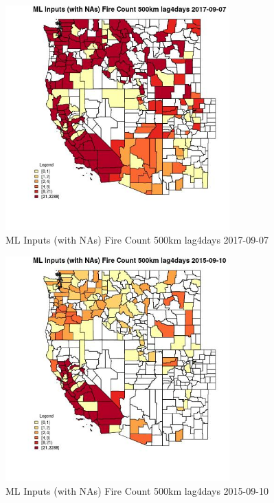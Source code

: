 \begin{figure} 
\centering  
\includegraphics[width=0.77\textwidth]{Code_Outputs/Report_ML_input_PM25_Step4_part_e_de_duplicated_aves_compiled_2019-05-21wNAs_CountyFire_Count_500km_lag4daysMean2017-09-07.jpg} 
\caption{\label{fig:Report_ML_input_PM25_Step4_part_e_de_duplicated_aves_compiled_2019-05-21wNAsCountyFire_Count_500km_lag4daysMean2017-09-07}ML Inputs (with NAs) Fire Count 500km lag4days 2017-09-07} 
\end{figure} 
 

\begin{figure} 
\centering  
\includegraphics[width=0.77\textwidth]{Code_Outputs/Report_ML_input_PM25_Step4_part_e_de_duplicated_aves_compiled_2019-05-21wNAs_CountyFire_Count_500km_lag4daysMean2015-09-10.jpg} 
\caption{\label{fig:Report_ML_input_PM25_Step4_part_e_de_duplicated_aves_compiled_2019-05-21wNAsCountyFire_Count_500km_lag4daysMean2015-09-10}ML Inputs (with NAs) Fire Count 500km lag4days 2015-09-10} 
\end{figure} 
 

